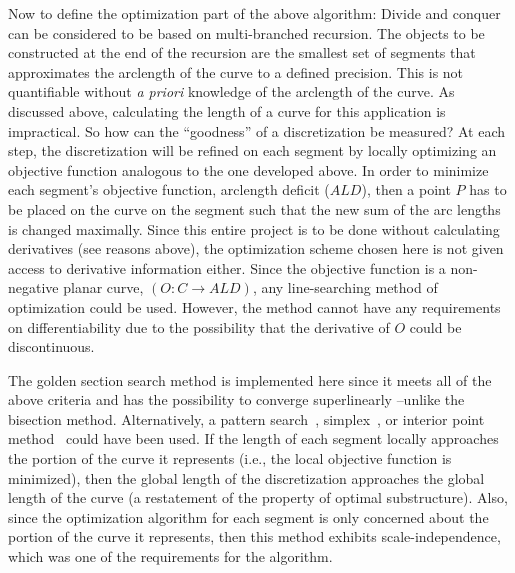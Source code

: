 Now to define the optimization part of the above algorithm: Divide and 
conquer can be considered to be based on multi-branched recursion. The 
objects to be constructed at the end of the recursion are the smallest set 
of segments that approximates the arclength of the curve to a defined 
precision. This is not quantifiable without {\it{a priori}} knowledge 
of the arclength of the curve. As discussed above, calculating the length 
of a curve for this application is impractical. So how can the 
``goodness'' of a discretization be measured?  At each step, the 
discretization will be refined on each segment by locally optimizing an 
objective function analogous to the one developed above. In order to 
minimize each segment's objective function, arclength deficit ($ALD$), 
then a point $P$ has to be placed on the curve on the segment such 
that the new sum of the arc lengths is changed maximally. Since this 
entire project is to be done without calculating derivatives (see reasons 
above), the optimization scheme chosen here is not given access to 
derivative information either. Since the objective function is a 
non-negative planar curve, $(O: C \rightarrow ALD)$, any line-searching 
method of optimization could be used. However, the method cannot have any 
requirements on differentiability due to the possibility that the 
derivative of $O$ could be discontinuous.

The golden section search method is implemented here since it meets all of 
the above criteria and has the possibility to converge superlinearly 
\cite{brent73}--unlike the bisection method.  Alternatively, a pattern 
search~\cite{}, simplex~\cite{}, or interior point method~\cite{} could 
have been used.  If the length of each segment locally approaches the 
portion of the curve it represents (i.e., the local objective function is 
minimized), then the global length of the discretization approaches the 
global length of the curve (a restatement of the property of optimal 
substructure). Also, since the optimization algorithm for each segment is 
only concerned about the portion of the curve it represents, then this 
method exhibits scale-independence, which was one of the requirements for 
the algorithm.

